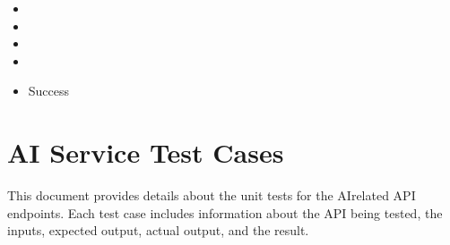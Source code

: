 \documentclass[letterpaper,10pt,english]{sphinxmanual}
\begin{document}
\subsection{}
\label{\detokenize{src/codeComputingTestCases:test-case-test-delete-code-info-not-found}}\begin{itemize}
\item {} 
\sphinxAtStartPar
{} 

\item {} 
\sphinxAtStartPar
{}

\begin{sphinxVerbatim}[commandchars=\\\{\}]
\end{sphinxVerbatim}

\item {} 
\sphinxAtStartPar
{}

\begin{sphinxVerbatim}[commandchars=\\\{\}]
\end{sphinxVerbatim}

\item {} 
\sphinxAtStartPar
{}

\begin{sphinxVerbatim}[commandchars=\\\{\}]
\end{sphinxVerbatim}

\item {} 
\sphinxAtStartPar
{} Success

\end{itemize}

\sphinxstepscope


\chapter{AI Service Test Cases}
\label{\detokenize{src/genAITestCases:ai-service-test-cases}}\label{\detokenize{src/genAITestCases::doc}}
\sphinxAtStartPar
This document provides details about the unit tests for the AI\sphinxhyphen{}related API endpoints. Each test case includes information about the API being tested, the inputs, expected output, actual output, and the result.
\end{document}
